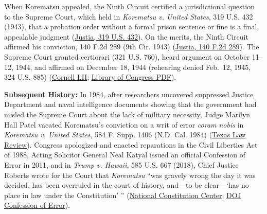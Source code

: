 \documentclass[12pt]{article}
\begin{document}
When Korematsu appealed, the Ninth Circuit certified a jurisdictional question to the Supreme Court, which held in \textit{Korematsu v. United States}, 319 U.S. 432 (1943), that a probation order without a formal prison sentence or fine is a final, appealable judgment (\href{https://supreme.justia.com/cases/federal/us/319/432/}{Justia, 319 U.S. 432}). On the merits, the Ninth Circuit affirmed his conviction, 140 F.2d 289 (9th Cir. 1943) (\href{https://law.justia.com/cases/federal/appellate-courts/F2/140/289/1567033/}{Justia, 140 F.2d 289}). The Supreme Court granted certiorari (321 U.S. 760), heard argument on October 11--12, 1944, and affirmed on December 18, 1944 (rehearing denied Feb.\ 12, 1945, 324 U.S. 885) (\href{https://www.law.cornell.edu/supremecourt/text/323/214}{Cornell LII}; \href{https://tile.loc.gov/storage-services/service/ll/usrep/usrep323/usrep323214/usrep323214.pdf}{Library of Congress PDF}).

\textbf{Subsequent History:} In 1984, after researchers uncovered suppressed Justice Department and naval intelligence documents showing that the government had misled the Supreme Court about the lack of military necessity, Judge Marilyn Hall Patel vacated Korematsu's conviction on a writ of error \textit{coram nobis} in \textit{Korematsu v. United States}, 584 F. Supp. 1406 (N.D. Cal. 1984) (\href{https://texaslawreview.org/korematsu-hirabayashi-and-the-second-monster/}{Texas Law Review}). Congress apologized and enacted reparations in the Civil Liberties Act of 1988, Acting Solicitor General Neal Katyal issued an official Confession of Error in 2011, and in \textit{Trump v. Hawaii}, 585 U.S. 667 (2018), Chief Justice Roberts wrote for the Court that \textit{Korematsu} ``was gravely wrong the day it was decided, has been overruled in the court of history, and---to be clear---`has no place in law under the Constitution' '' (\href{https://constitutioncenter.org/blog/on-this-day-the-supreme-court-issues-the-korematsu-decision}{National Constitution Center}; \href{https://www.justice.gov/archives/opa/blog/confession-error-solicitor-generals-mistakes-during-japanese-american-internment-cases}{DOJ Confession of Error}).
\end{document}
